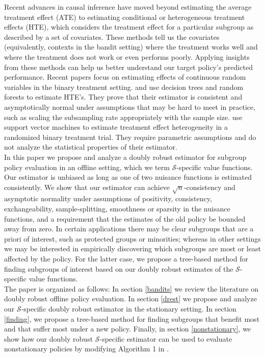 Recent advances in causal inference have moved beyond estimating the average treatment effect (ATE) to estimating conditional or heterogeneous treatment effects (HTE), which considers the treatment effect for a particular subgroup as described by a set of covariates. These methods tell us the covariates (equivalently, contexts in the bandit setting) where the treatment works well and where the treatment does not work or even performs poorly. Applying insights from these methods can help us better understand our target policy's predicted performance. Recent papers focus on estimating effects of continuous random variables in the binary treatment setting. \cite{wager2017estimation} and \cite{athey2016recursive} use decision trees and random forests to estimate HTE's. They prove that their estimator is consistent and asymptotically normal under assumptions that may be hard to meet in practice, such as scaling the subsampling rate appropriately with the sample size. \cite{imai2013estimating} use support vector machines to estimate treatment effect heterogeneity in a randomized binary treatment trial. They require parametric assumptions and do not analyze the statistical properties of their estimator. \\

In this paper we propose and analyze a doubly robust estimator for subgroup policy evaluation in an offline setting, which we term $\mathcal{S}$-specific value functions. Our estimator is unbiased as long as one of two nuisance functions is estimated consistently. We show that our estimator can achieve $\sqrt{n}$-consistency and asymptotic normality under assumptions of positivity, consistency, exchangeability, sample-splitting, smoothness or sparsity in the nuisance functions, and a requirement that the estimates of the old policy be bounded away from zero. In certain applications there may be clear subgroups that are a priori of interest, such as protected groups or minorities; whereas in other settings we may be interested in empirically discovering which subgroups are most or least affected by the policy. For the latter case, we propose a tree-based method for finding subgroups of interest based on our doubly robust estimates of the $\mathcal{S}$-specific value functions.  \\

The paper is organized as follows: In section \ref{bandits} we review the literature on doubly robust offline policy evaluation. In section \ref{drest} we propose and analyze our $\mathcal{S}$-specific doubly robust estimator in the stationary setting. In section \ref{finding}, we propose a tree-based method for finding subgroups that benefit most and that suffer most under a new policy. Finally, in section \ref{nonstationary}, we show how our doubly robust $\mathcal{S}$-specific estimator can be used to evaluate nonstationary policies by modifying Algorithm 1 in \cite{dudik2014doubly}. \\

